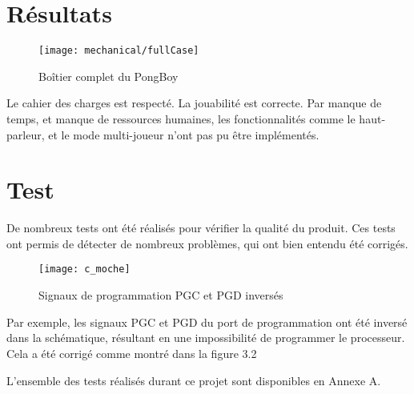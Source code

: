 \section{Résultats}
\begin{figure}[H]
  \centering
  \texttt{[image: mechanical/fullCase]}
  \caption{Boîtier complet du PongBoy}
  \label{mech_pongboy}
\end{figure}
Le cahier des charges est respecté. La jouabilité est correcte.
Par manque de temps, et manque de ressources humaines,
les fonctionnalités comme le haut-parleur, et le mode multi-joueur n'ont pas
pu être implémentés.
\newpage

\section{Test}
De nombreux tests ont été réalisés pour vérifier la qualité du produit.
Ces tests ont permis de détecter de nombreux problèmes, qui ont bien
entendu été corrigés.
\begin{figure}[H]
  \centering
  \texttt{[image: c\_moche]}
  \caption{Signaux de programmation PGC et PGD inversés}
  \label{c_moche}
\end{figure}
Par exemple, les signaux PGC et PGD du port de programmation ont été inversé
dans la schématique, résultant en une impossibilité de programmer le processeur.
Cela a été corrigé comme montré dans la figure 3.2

L'ensemble des tests réalisés durant ce projet sont disponibles en Annexe A.
